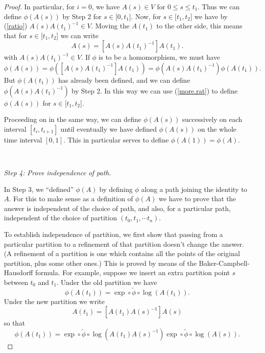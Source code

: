 \documentclass[12pt]{amsbook}
\theoremstyle{plain}
\numberwithin{equation}{chapter}
\numberwithin{theorem}{chapter}
\begin{document}
\begin{proof}
In particular, for $i=0$, we have $A(s)\in V$ for $0\leq s\leq t_{1}$. Thus we
can define $\phi\left(  A(s)\right)  $ by Step 2 for $s\in\lbrack0,t_{1}]$.
Now, for $s\in\lbrack t_{1},t_{2}]$ we have by (\ref{ratio}) $A(s)A(t_{1}%
)^{-1}\in V$. Moving the $A(t_{1})$ to the other side, this means that for
$s\in\lbrack t_{1},t_{2}]$ we can write
\[
A(s)=\left[  A(s)A(t_{1})^{-1}\right]  A(t_{1})\text{.}%
\]
with $A(s)A(t_{1})^{-1}\in V$. If $\phi$ is to be a homomorphism, we must
have
\begin{equation}
\phi\left(  A(s)\right)  =\phi\left(  \left[  A(s)A(t_{1})^{-1}\right]
A(t_{1})\right)  =\phi\left(  A(s)A(t_{1})^{-1}\right)  \phi\left(
A(t_{1})\right)  \text{.}\label{more.rat}%
\end{equation}
But $\phi\left(  A(t_{1})\right)  $ has already been defined, and we can
define $\phi\left(  A(s)A(t_{1})^{-1}\right)  $ by Step 2. In this way we can
use (\ref{more.rat}) to define $\phi\left(  A(s)\right)  $ for $s\in\lbrack
t_{1},t_{2}]$.

Proceeding on in the same way, we can define $\phi\left(  A(s)\right)  $
successively on each interval $[t_{i},t_{i+1}]$ until eventually we have
defined $\phi\left(  A(s)\right)  $ on the whole time interval $[0,1]$. This
in particular serves to define $\phi\left(  A(1)\right)  =\phi(A)$.

\ 

\textit{Step 4: Prove independence of path.}

In Step 3, we ``defined'' $\phi(A)$ by defining $\phi$ along a path joining
the identity to $A$. For this to make sense as a definition of $\phi(A)$ we
have to prove that the answer is independent of the choice of path, and also,
for a particular path, independent of the choice of partition $(t_{0}%
,t_{1},\cdots t_{n})$.

To establish independence of partition, we first show that passing from a
particular partition to a refinement of that partition doesn't change the
answer. (A refinement of a partition is one which contains all the points of
the original partition, plus some other ones.) This is proved by means of the
Baker-Campbell-Hausdorff formula. For example, suppose we insert an extra
partition point $s$ between $t_{0}$ and $t_{1}$. Under the old partition we
have
\begin{equation}
\phi\left(  A(t_{1})\right)  =\exp\circ\widetilde{\phi}\circ\log\left(
A(t_{1})\right)  \text{.}\label{old}%
\end{equation}
Under the new partition we write
\[
A(t_{1})=\left[  A(t_{1})A(s)^{-1}\right]  A(s)
\]
so that
\begin{equation}
\phi\left(  A(t_{1})\right)  =\exp\circ\widetilde{\phi}\circ\log\left(
A(t_{1})A(s)^{-1}\right)  \exp\circ\widetilde{\phi}\circ\log\left(
A(s)\right)  \text{.}\label{new}%
\end{equation}


\end{proof}
\end{document}
